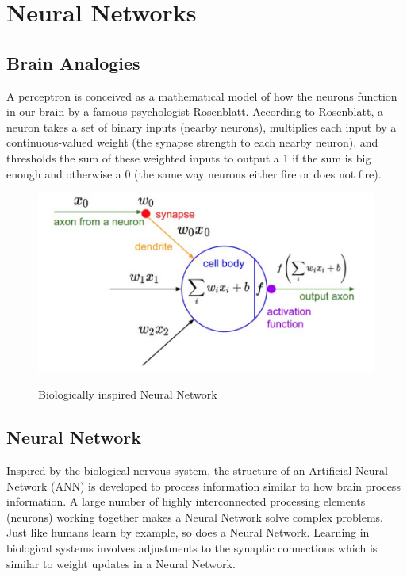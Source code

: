 \pagebreak

\section{Neural Networks}
\subsection{Brain Analogies}

A perceptron is conceived as a mathematical model of how the neurons function in our brain by a famous psychologist Rosenblatt. According to Rosenblatt, a neuron  takes a set of binary inputs (nearby neurons), multiplies each input by a continuous-valued weight (the synapse strength to each nearby neuron), and thresholds the sum of these weighted inputs to output a 1 if the sum is big enough and otherwise a 0 (the same way neurons either fire or does not fire).

\begin{figure}[H]
\begin{center}
\includegraphics[height=.28\textheight]{Chapter2/Figs/NeuralNetwork.png}
\label{fig:Neural_Network}
\caption{Biologically inspired Neural Network \cite{karparthy}}
\end{center}
\end{figure}

\subsection{Neural Network}

Inspired by the biological nervous system, the structure of an Artificial Neural Network (ANN) is developed to process information similar to how brain process information. A large number of highly interconnected processing elements (neurons) working together makes a Neural Network solve complex problems. Just like humans learn by example, so does a Neural Network. Learning in biological systems involves adjustments to the synaptic connections which is similar to weight updates in a Neural Network. 

